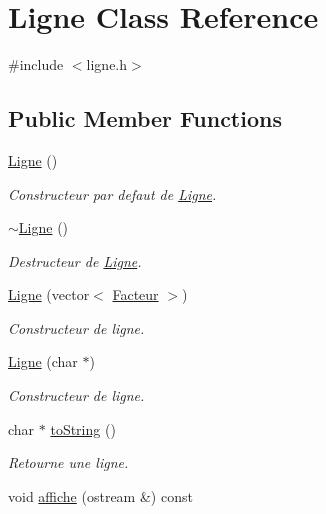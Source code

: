 \hypertarget{class_ligne}{\section{Ligne Class Reference}
\label{class_ligne}
}


{\ttfamily \#include $<$ligne.\-h$>$}

\subsection*{Public Member Functions}
\begin{DoxyCompactItemize}
\item 
\hypertarget{class_ligne_aa8953c4b617add4054ed9f73b36995b7}{\hyperlink{class_ligne_aa8953c4b617add4054ed9f73b36995b7}{Ligne} ()}\label{class_ligne_aa8953c4b617add4054ed9f73b36995b7}

\begin{DoxyCompactList}\small\item\em Constructeur par defaut de \hyperlink{class_ligne}{Ligne}. \end{DoxyCompactList}\item 
\hypertarget{class_ligne_a7496e90cf05bab745e3645919d33c811}{\hyperlink{class_ligne_a7496e90cf05bab745e3645919d33c811}{$\sim$\-Ligne} ()}\label{class_ligne_a7496e90cf05bab745e3645919d33c811}

\begin{DoxyCompactList}\small\item\em Destructeur de \hyperlink{class_ligne}{Ligne}. \end{DoxyCompactList}\item 
\hyperlink{class_ligne_a7065d8ee1a96e034b1c6ccb2381ef767}{Ligne} (vector$<$ \hyperlink{class_facteur}{Facteur} $>$)
\begin{DoxyCompactList}\small\item\em Constructeur de ligne. \end{DoxyCompactList}\item 
\hypertarget{class_ligne_ad04b7ec786a0a860d41c842570b4f1da}{\hyperlink{class_ligne_ad04b7ec786a0a860d41c842570b4f1da}{Ligne} (char $\ast$)}\label{class_ligne_ad04b7ec786a0a860d41c842570b4f1da}

\begin{DoxyCompactList}\small\item\em Constructeur de ligne. \end{DoxyCompactList}\item 
char $\ast$ \hyperlink{class_ligne_ac50b7665f6259fd0eb8f00dca6142bba}{to\-String} ()
\begin{DoxyCompactList}\small\item\em Retourne une ligne. \end{DoxyCompactList}\item 
\hypertarget{class_ligne_a283b2e758aec620553e4df9ed9e20fd2}{void \hyperlink{class_ligne_a283b2e758aec620553e4df9ed9e20fd2}{affiche} (ostream \&) const }\label{class_ligne_a283b2e758aec620553e4df9ed9e20fd2}


\end{DoxyCompactItemize}
